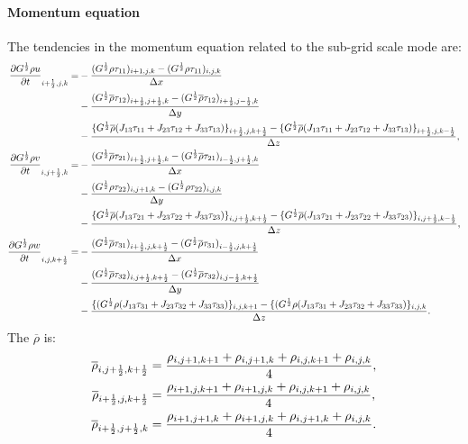 \paragraph{Momentum equation}
The tendencies in the momentum equation related to the sub-grid scale mode are:
\begin{align}
  \frac{\partial G^{\frac{1}{2}}\rho u}{\partial t}_{i+\frac{1}{2},j,k} =
  &-\frac{(G^{\frac{1}{2}}\rho\tau_{11})_{i+1,j,k}-(G^{\frac{1}{2}}\rho\tau_{11})_{i,j,k}}{\Delta x} \nonumber \\
  &- \frac{(G^{\frac{1}{2}}\overline{\rho}\tau_{12})_{i+\frac{1}{2},j+\frac{1}{2},k}-(G^{\frac{1}{2}}\overline{\rho}\tau_{12})_{i+\frac{1}{2},j-\frac{1}{2},k}}{\Delta y} \nonumber \\
  &- \frac{\{G^{\frac{1}{2}}\overline{\rho}(J_{13}\tau_{11}+J_{23}\tau_{12}+J_{33}\tau_{13})\}_{i+\frac{1}{2},j,k+\frac{1}{2}}
          -\{G^{\frac{1}{2}}\overline{\rho}(J_{13}\tau_{11}+J_{23}\tau_{12}+J_{33}\tau_{13})\}_{i+\frac{1}{2},j,k-\frac{1}{2}}}{\Delta z}, \\
  \frac{\partial G^{\frac{1}{2}}\rho v}{\partial t}_{i,j+\frac{1}{2},k} =
  &- \frac{(G^{\frac{1}{2}}\overline{\rho}\tau_{21})_{i+\frac{1}{2},j+\frac{1}{2},k}-(G^{\frac{1}{2}}\overline{\rho}\tau_{21})_{i-\frac{1}{2},j+\frac{1}{2},k}}{\Delta x} \nonumber \\
  &- \frac{(G^{\frac{1}{2}}\rho\tau_{22})_{i,j+1,k}-(G^{\frac{1}{2}}\rho\tau_{22})_{i,j,k}}{\Delta y} \nonumber \\
  &- \frac{\{G^{\frac{1}{2}}\overline{\rho}(J_{13}\tau_{21}+J_{23}\tau_{22}+J_{33}\tau_{23})\}_{i,j+\frac{1}{2},k+\frac{1}{2}}
          -\{G^{\frac{1}{2}}\overline{\rho}(J_{13}\tau_{21}+J_{23}\tau_{22}+J_{33}\tau_{23})\}_{i,j+\frac{1}{2},k-\frac{1}{2}}}{\Delta z}, \\
  \frac{\partial G^{\frac{1}{2}}\rho w}{\partial t}_{i,j,k+\frac{1}{2}} =
  &- \frac{(G^{\frac{1}{2}}\overline{\rho}\tau_{31})_{i+\frac{1}{2},j,k+\frac{1}{2}}-(G^{\frac{1}{2}}\overline{\rho}\tau_{31})_{i-\frac{1}{2},j,k+\frac{1}{2}}}{\Delta x} \nonumber \\
  &- \frac{(G^{\frac{1}{2}}\overline{\rho}\tau_{32})_{i,j+\frac{1}{2},k+\frac{1}{2}}-(G^{\frac{1}{2}}\overline{\rho}\tau_{32})_{i,j-\frac{1}{2},k+\frac{1}{2}}}{\Delta y} \nonumber \\
  &- \frac{\{(G^{\frac{1}{2}}\rho(J_{13}\tau_{31}+J_{23}\tau_{32}+J_{33}\tau_{33})\}_{i,j,k+1}
          -\{(G^{\frac{1}{2}}\rho(J_{13}\tau_{31}+J_{23}\tau_{32}+J_{33}\tau_{33})\}_{i,j,k}}{\Delta z}.
\end{align}
The $\overline{\rho}$ is:
\begin{align}
  \overline{\rho}_{i,j+\frac{1}{2},k+\frac{1}{2}} &=
  \frac{\rho_{i,j+1,k+1} + \rho_{i,j+1,k} + \rho_{i,j,k+1} + \rho_{i,j,k}}{4}, \\
  \overline{\rho}_{i+\frac{1}{2},j,k+\frac{1}{2}} &=
  \frac{\rho_{i+1,j,k+1} + \rho_{i+1,j,k} + \rho_{i,j,k+1} + \rho_{i,j,k}}{4}, \\
  \overline{\rho}_{i+\frac{1}{2},j+\frac{1}{2},k} &=
  \frac{\rho_{i+1,j+1,k} + \rho_{i+1,j,k} + \rho_{i,j+1,k} + \rho_{i,j,k}}{4}.
\end{align}

